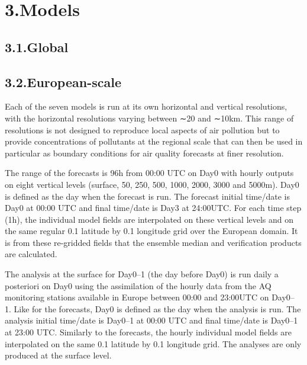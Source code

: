 \documentclass[9pt]{report}
\begin{document}
\section{3.\hspace*{0.5em}Models}\label{sec-models}%

\subsection{3.1.\hspace*{0.5em}Global}\label{sec-global}%

\subsection{3.2.\hspace*{0.5em}European-scale}\label{sec-european-scale}%

\noindent{}Each of the seven models is run at its own horizontal and vertical resolutions, with the horizontal resolutions varying between ∼20 and ∼10km. 
This range of resolutions is not designed to reproduce local aspects of air pollution but to provide concentrations of pollutants at the regional scale that can then be used in particular as boundary conditions for air quality forecasts at finer resolution.%

The range of the forecasts is 96h from 00:00 UTC on Day0 with hourly outputs on eight vertical levels (surface, 50, 250, 500, 1000, 2000, 3000 and 5000m). 
Day0 is defined as the day when the forecast is run. 
The forecast initial time/date is Day0 at 00:00 UTC and final time/date is Day3 at 24:00UTC. 
For each time step (1h), the individual model fields are interpolated on these vertical levels and on the same regular 0.1\textdegree{} latitude by 0.1\textdegree{} longitude grid over the European domain. 
It is from these re-gridded fields that the ensemble median and verification products are calculated.%

The analysis at the surface for Day0–1 (the day before Day0) is run daily a posteriori on Day0 using the assimilation of the hourly data from the AQ monitoring stations available in Europe between 00:00 and 23:00UTC on Day0– 1. 
Like for the forecasts, Day0 is defined as the day when the analysis is run. 
The analysis initial time/date is Day0–1 at 00:00 UTC and final time/date is Day0–1 at 23:00 UTC. 
Similarly to the forecasts, the hourly individual model fields are interpolated on the same 0.1\textdegree{} latitude by 0.1\textdegree{} longitude grid. 
The analyses are only produced at the surface level.%
\end{document}
